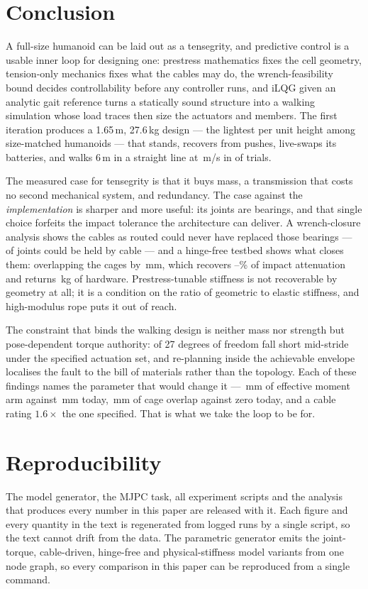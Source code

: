 \documentclass[conference]{IEEEtran}
\begin{document}
\section{Conclusion}
A full-size humanoid can be laid out as a tensegrity, and predictive control is
a usable inner loop for designing one: prestress mathematics fixes the cell
geometry, tension-only mechanics fixes what the cables may do, the
wrench-feasibility bound decides controllability before any controller runs,
and iLQG given an analytic gait reference turns a statically sound structure
into a walking simulation whose load traces then size the actuators and
members. The first iteration produces a 1.65\,m, 27.6\,kg design --- the
lightest per unit height among size-matched humanoids --- that stands, recovers
from pushes, live-swaps its batteries, and walks 6\,m in a straight line at
\walkSpeed\,m/s in \walkRate{} of trials.

The measured case for tensegrity is that it buys mass, a transmission that
costs no second mechanical system, and redundancy. The case against the
\emph{implementation} is sharper and more useful: its joints are bearings, and
that single choice forfeits the impact tolerance the architecture can deliver.
A wrench-closure analysis shows the cables as routed could never have replaced
those bearings --- \wcThree{} of \wcTotal{} joints could be held by cable ---
and a hinge-free testbed shows what closes them: overlapping the cages by
\jointOverlapMm\,mm, which recovers \jointImpactLo--\jointImpactHi\% of impact
attenuation and returns \bearingMass\,kg of hardware. Prestress-tunable
stiffness is not recoverable by geometry at all; it is a condition on the ratio
of geometric to elastic stiffness, and high-modulus rope puts it out of reach.

The constraint that binds the walking design is neither mass nor strength but
pose-dependent torque authority: \authShortGaitBom{} of 27 degrees of freedom
fall short mid-stride under the specified actuation set, and re-planning inside
the achievable envelope localises the fault to the bill of materials rather
than the topology. Each of these findings names the parameter that would change
it --- \rNeedHip\,mm of effective moment arm against \rHaveHip\,mm today,
\jointOverlapMm\,mm of cage overlap against zero today, and a cable rating
$1.6\times$ the one specified. That is what we take the loop to be for.

\section*{Reproducibility}
The model generator, the MJPC task, all experiment scripts and the analysis
that produces every number in this paper are released with it. Each figure and
every quantity in the text is regenerated from logged runs by a single script,
so the text cannot drift from the data. The parametric generator emits the
joint-torque, cable-driven, hinge-free and physical-stiffness model variants
from one node graph, so every comparison in this paper can be reproduced from
a single command.



\end{document}
